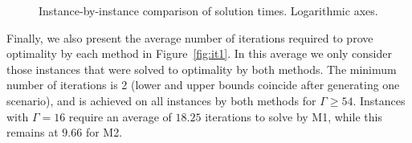 \begin{figure}[htbp]
\begin{center}
%
\hfill
{}
\end{center}
\caption{Instance-by-instance comparison of solution times. Logarithmic axes.\label{fig:tvst}}
\end{figure}

Finally, we also present the average number of iterations required to prove optimality by each method in Figure~\ref{fig:it1}. In this average we only consider those instances that were solved to optimality by both methods. The minimum number of iterations is 2 (lower and upper bounds coincide after generating one scenario), and is achieved on all instances by both methods for $\Gamma \ge 54$. Instances with $\Gamma=16$ require an average of $18.25$ iterations to solve by M1, while this remains at $9.66$ for M2.

